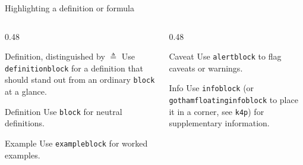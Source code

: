 %
%

\begin{standardframe}{Highlighting a definition or formula}
	\footnotesize
	\begin{columns}[t,onlytextwidth]
		\begin{column}{0.48\linewidth}
			\begin{definitionblock}{Definition, distinguished by $\triangleq$}
				Use \texttt{definitionblock} for a definition that should stand
				out from an ordinary \texttt{block} at a glance.
			\end{definitionblock}
			\begin{block}{Definition}
				Use \texttt{block} for neutral definitions.
			\end{block}
			\begin{exampleblock}{Example}
				Use \texttt{exampleblock} for worked examples.
			\end{exampleblock}
		\end{column}
		\begin{column}{0.48\linewidth}
			\begin{alertblock}{Caveat}
				Use \texttt{alertblock} to flag caveats or warnings.
			\end{alertblock}
			\begin{infoblock}{Info}
				Use \texttt{infoblock} (or \texttt{gothamfloatinginfoblock} to
				place it in a corner, see \texttt{k4p}) for supplementary
				information.
			\end{infoblock}
		\end{column}
	\end{columns}
\end{standardframe}
